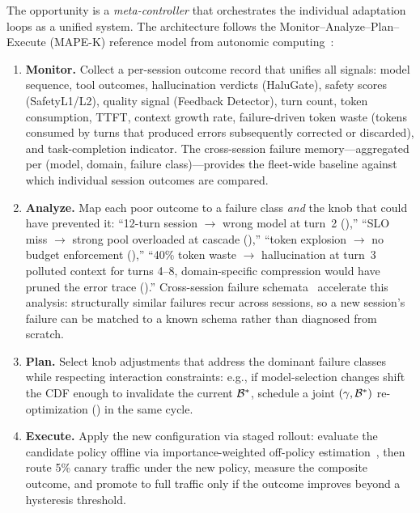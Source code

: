 \begin{opportunity}
The opportunity is a \emph{meta-controller} that orchestrates the
individual adaptation loops as a unified system.  The architecture
follows the Monitor--Analyze--Plan--Execute (MAPE-K) reference
model from autonomic computing~\cite{kephart2003autonomic}:
\begin{enumerate}[nosep]
  \item \textbf{Monitor.}  Collect a per-session outcome record
        that unifies all signals: model sequence, tool outcomes,
        hallucination verdicts (HaluGate), safety scores
        (SafetyL1/L2), quality signal (Feedback Detector), turn
        count, token consumption, TTFT, context growth rate,
        failure-driven token waste (tokens consumed by turns that
        produced errors subsequently corrected or discarded), and
        task-completion indicator.  The cross-session failure
        memory---aggregated per (model, domain, failure
        class)---provides the fleet-wide baseline against which
        individual session outcomes are compared.
  \item \textbf{Analyze.}  Map each poor outcome to a failure class
        \emph{and} the knob that could have prevented it:
        ``12-turn session $\to$ wrong model at turn~2
        (),'' ``SLO miss $\to$ strong
        pool overloaded at cascade (),''
        ``token explosion $\to$ no budget enforcement
        (),'' ``40\% token waste $\to$
        hallucination at turn~3 polluted context for turns 4--8,
        domain-specific compression would have pruned the error
        trace ().''  Cross-session
        failure schemata~\cite{correct2025} accelerate this
        analysis: structurally similar failures recur across
        sessions, so a new session's failure can be matched to a
        known schema rather than diagnosed from scratch.
  \item \textbf{Plan.}  Select knob adjustments that address the
        dominant failure classes while respecting interaction
        constraints: e.g., if model-selection changes shift the CDF
        enough to invalidate the current $\mathcal{B}^*$, schedule a
        joint $(\gamma, \mathcal{B}^*)$ re-optimization
        () in the same cycle.
  \item \textbf{Execute.}  Apply the new configuration via staged
        rollout: evaluate the candidate policy offline via
        importance-weighted off-policy
        estimation~\cite{deltope2024}, then route 5\% canary
        traffic under the new policy, measure the composite
        outcome, and promote to full traffic only if the outcome
        improves beyond a hysteresis threshold.
\end{enumerate}


\end{opportunity}
